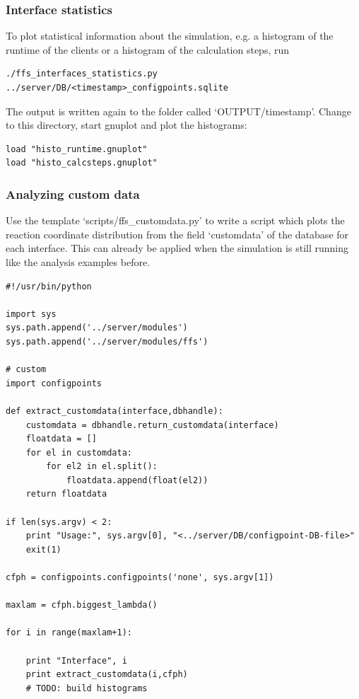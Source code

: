\documentclass[a4paper,oneside]{article}
\newenvironment{mylisting}
{\begin{list}{}{\setlength{\leftmargin}{1em}}\item\scriptsize\bfseries}
{\end{list}}
\begin{document}
\subsubsection{Interface statistics}
To plot statistical information about the simulation, e.g. a histogram of the runtime of the clients or a histogram of the calculation steps, run
\begin{mylisting}
\begin{verbatim}
./ffs_interfaces_statistics.py ../server/DB/<timestamp>_configpoints.sqlite
\end{verbatim}
\end{mylisting}
The output is written again to the folder called `OUTPUT/timestamp'. Change to this directory, start gnuplot and plot the histograms:
\begin{mylisting}
\begin{verbatim}
load "histo_runtime.gnuplot"
load "histo_calcsteps.gnuplot"
\end{verbatim}
\end{mylisting}


\subsubsection{Analyzing custom data}
Use the template `scripts/ffs\_customdata.py' to write a script which plots the reaction coordinate distribution from the field `customdata' of the database for each interface. This can already be applied when the simulation is still running like the analysis examples before.
\begin{mylisting}
\begin{verbatim}
#!/usr/bin/python

import sys
sys.path.append('../server/modules')
sys.path.append('../server/modules/ffs')

# custom
import configpoints

def extract_customdata(interface,dbhandle):
    customdata = dbhandle.return_customdata(interface)
    floatdata = []
    for el in customdata:
        for el2 in el.split():
            floatdata.append(float(el2))
    return floatdata

if len(sys.argv) < 2:
    print "Usage:", sys.argv[0], "<../server/DB/configpoint-DB-file>"
    exit(1)

cfph = configpoints.configpoints('none', sys.argv[1])

maxlam = cfph.biggest_lambda()

for i in range(maxlam+1):

    print "Interface", i
    print extract_customdata(i,cfph)
    # TODO: build histograms
\end{verbatim}
\end{mylisting}
\end{document}
